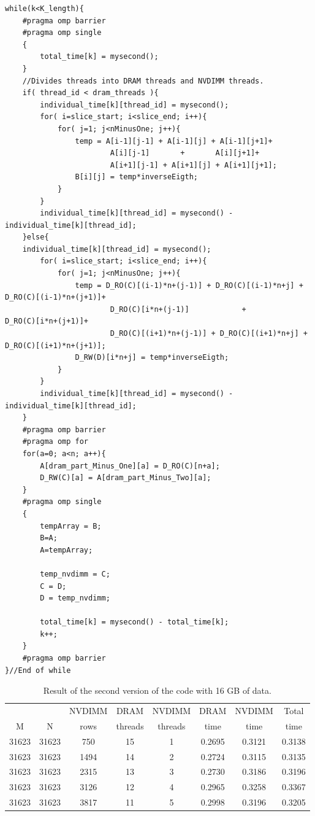 \documentclass[12pt,a4paper,USenglish]{article}      %
\begin{document}
\begin{lstlisting}[caption=Second version of the code where the threads are using ghost array instead of accessing the other type of memory directly.]
while(k<K_length){
	#pragma omp barrier
	#pragma omp single
	{
		total_time[k] = mysecond();
	}
	//Divides threads into DRAM threads and NVDIMM threads.
	if( thread_id < dram_threads ){
		individual_time[k][thread_id] = mysecond();
		for( i=slice_start; i<slice_end; i++){
			for( j=1; j<nMinusOne; j++){
				temp = A[i-1][j-1] + A[i-1][j] + A[i-1][j+1]+
						A[i][j-1]       +       A[i][j+1]+
						A[i+1][j-1] + A[i+1][j] + A[i+1][j+1];
				B[i][j] = temp*inverseEigth;
			}
		}
		individual_time[k][thread_id] = mysecond() - individual_time[k][thread_id];
	}else{
	individual_time[k][thread_id] = mysecond();
		for( i=slice_start; i<slice_end; i++){
        	for( j=1; j<nMinusOne; j++){
        		temp = D_RO(C)[(i-1)*n+(j-1)] + D_RO(C)[(i-1)*n+j] + D_RO(C)[(i-1)*n+(j+1)]+
        				D_RO(C)[i*n+(j-1)]            +            D_RO(C)[i*n+(j+1)]+
        				D_RO(C)[(i+1)*n+(j-1)] + D_RO(C)[(i+1)*n+j] + D_RO(C)[(i+1)*n+(j+1)];
        		D_RW(D)[i*n+j] = temp*inverseEigth;
        	}
        }
		individual_time[k][thread_id] = mysecond() - individual_time[k][thread_id];
	}
	#pragma omp barrier
	#pragma omp for
	for(a=0; a<n; a++){
		A[dram_part_Minus_One][a] = D_RO(C)[n+a];
		D_RW(C)[a] = A[dram_part_Minus_Two][a];
	}
	#pragma omp single
	{
		tempArray = B;
		B=A;
		A=tempArray;

		temp_nvdimm = C;
		C = D;
		D = temp_nvdimm;

		total_time[k] = mysecond() - total_time[k];
		k++;
	}
	#pragma omp barrier
}//End of while
\end{lstlisting}


\begin{table}[!hbtp]
\centering
\begin{tabular}{ |c|c|c|c|c|c|c|c| }
\hline
&  & NVDIMM & DRAM & NVDIMM & DRAM & NVDIMM & Total \\
M & N & rows & threads & threads & time & time & time \\
\hline
31623 & 31623 & 750 & 15 & 1 & 0.2695 & 0.3121 & 0.3138 \\
\hline
31623 & 31623 & 1494 & 14 & 2 & 0.2724 & 0.3115 & 0.3135 \\
\hline
31623 & 31623 & 2315 & 13 & 3 & 0.2730 & 0.3186 & 0.3196 \\
\hline
31623 & 31623 & 3126 & 12 & 4 & 0.2965 & 0.3258 & 0.3367 \\
\hline
31623 & 31623 & 3817 & 11 & 5 & 0.2998 & 0.3196 & 0.3205 \\
\hline
\end{tabular}
\caption{Result of the second version of the code with 16 GB of data.}
\label{tab:SecondVersion16GB}
\end{table}
\end{document}
